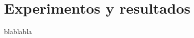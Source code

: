 \documentclass[conference,spanish,a4paper,10pt,oneside,final]{tfmpd}
\begin{document}
\section{Experimentos y resultados}
blablabla
%
%
\end{document}
